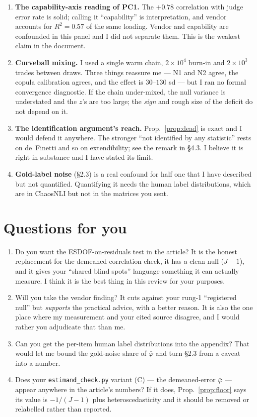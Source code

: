 \documentclass[11pt]{article}
\theoremstyle{definition}
\newcommand{\phib}{\bar\varphi}
\begin{document}
\begin{enumerate}
\item \textbf{The capability-axis reading of PC1.} The $+0.78$ correlation with judge
error rate is solid; calling it ``capability'' is interpretation, and vendor accounts
for $R^2=0.57$ of the same loading. Vendor and capability are confounded in this
panel and I did not separate them. This is the weakest claim in the document.
\item \textbf{Curveball mixing.} I used a single warm chain, $2\times10^4$ burn-in
and $2\times10^3$ trades between draws. Three things reassure me --- N1 and N2 agree,
the copula calibration agrees, and the effect is $30$--$130$ sd --- but I ran no
formal convergence diagnostic. If the chain under-mixed, the null variance is
understated and the $z$'s are too large; the \emph{sign} and rough size of the
deficit do not depend on it.
\item \textbf{The identification argument's reach.} Prop.~\ref{prop:dead} is exact
and I would defend it anywhere. The stronger ``not identified by any statistic''
rests on de~Finetti and so on extendibility; see the remark in \S4.3. I believe it
is right in substance and I have stated its limit.
\item \textbf{Gold-label noise} (\S2.3) is a real confound for half one that I have
described but not quantified. Quantifying it needs the human label distributions,
which are in ChaosNLI but not in the matrices you sent.
\end{enumerate}

\section{Questions for you}

\begin{enumerate}
\item Do you want the ESDOF-on-residuals test in the article? It is the honest
replacement for the demeaned-correlation check, it has a clean null ($J-1$), and it
gives your ``shared blind spots'' language something it can actually measure. I think
it is the best thing in this review for your purposes.
\item Will you take the vendor finding? It cuts against your rung-1 ``registered
null'' but \emph{supports} the practical advice, with a better reason. It is also the
one place where my measurement and your cited source disagree, and I would rather
you adjudicate that than me.
\item Can you get the per-item human label distributions into the appendix? That
would let me bound the gold-noise share of $\phib$ and turn \S2.3 from a caveat into
a number.
\item Does your \texttt{estimand\_check.py} variant (C) --- the demeaned-error
$\phib$ --- appear anywhere in the article's numbers? If it does, Prop.~\ref{prop:floor}
says its value is $-1/(J-1)$ plus heteroscedasticity and it should be removed or
relabelled rather than reported.
\end{enumerate}
\end{document}
